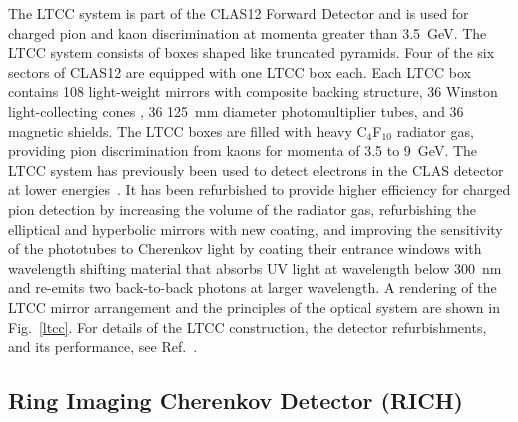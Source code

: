 \documentclass[final,3p,times,twocolumn,authoryear]{elsarticle}
\begin{document}
The LTCC system is part of the CLAS12  Forward Detector and is used for charged pion and kaon discrimination 
at momenta greater than 3.5~GeV. The LTCC system consists of boxes shaped like truncated pyramids. Four 
of the six sectors of CLAS12 are equipped with one LTCC box each. Each LTCC box contains 108 light-weight 
mirrors with composite backing structure, 36 Winston light-collecting cones , 36 125~mm diameter photomultiplier tubes,
and 36 magnetic shields. The LTCC boxes are filled with heavy C$_4$F$_{10}$ radiator gas, providing pion discrimination 
from kaons for momenta of 3.5 to 9~GeV.  The LTCC system has previously been used to detect electrons in the CLAS
detector at lower energies~\cite{Adams:2001kk}. It has been refurbished to provide higher efficiency for charged pion
detection by increasing the volume of the radiator gas, refurbishing the elliptical and hyperbolic mirrors with new coating,
and improving the sensitivity of the phototubes to Cherenkov light by coating their entrance windows with wavelength shifting
material that absorbs UV light at wavelength below 300~nm and re-emits two back-to-back photons at larger wavelength. A
rendering of the LTCC mirror arrangement and the principles of the optical system are shown in Fig.~\ref{ltcc}.  For details
of the LTCC construction, the detector refurbishments, and its performance, see Ref.~\cite{LTCC}.   

\subsection{Ring Imaging Cherenkov Detector (RICH)} 
\end{document}
